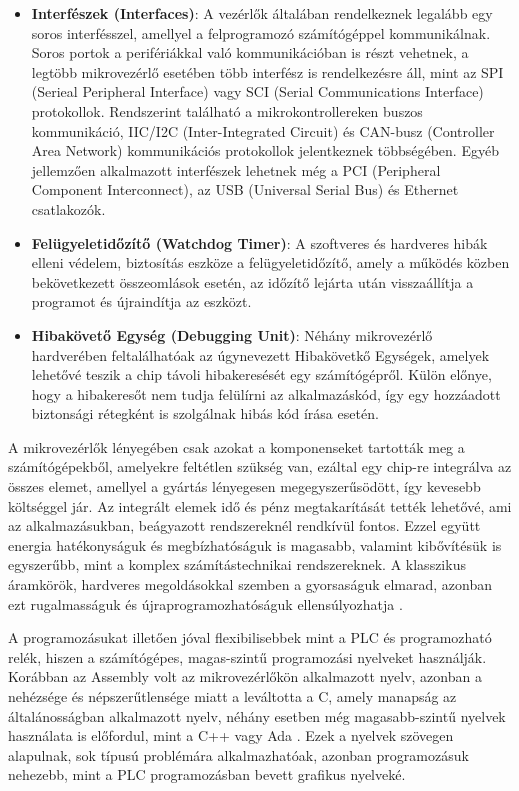 \begin{itemize}
	\item \textbf{Interfészek (Interfaces)}: A vezérlők általában rendelkeznek legalább egy soros interfésszel, amellyel a felprogramozó számítógéppel kommunikálnak. Soros portok a perifériákkal való kommunikációban is részt vehetnek, a legtöbb mikrovezérlő esetében több interfész is rendelkezésre áll, mint az SPI (Serieal Peripheral Interface) vagy SCI (Serial Communications Interface) protokollok. Rendszerint található a mikrokontrollereken buszos kommunikáció, IIC/I2C (Inter-Integrated Circuit) és CAN-busz (Controller Area Network) kommunikációs protokollok jelentkeznek többségében. Egyéb jellemzően alkalmazott interfészek lehetnek még a PCI (Peripheral Component Interconnect), az USB (Universal Serial Bus) és Ethernet csatlakozók.
	\item \textbf{Felügyeletidőzítő (Watchdog Timer)}: A szoftveres és hardveres hibák elleni védelem, biztosítás eszköze a felügyeletidőzítő, amely a működés közben bekövetkezett összeomlások esetén, az időzítő lejárta után visszaállítja a programot és újraindítja az eszközt.
	\item \textbf{Hibakövető Egység (Debugging Unit)}: Néhány mikrovezérlő hardverében feltalálhatóak az úgynevezett Hibakövetkő Egységek, amelyek lehetővé teszik a chip távoli hibakeresését egy számítógépről. Külön előnye, hogy a hibakeresőt nem tudja felülírni az alkalmazáskód, így egy hozzáadott biztonsági rétegként is szolgálnak hibás kód írása esetén.
\end{itemize}
A mikrovezérlők lényegében csak azokat a komponenseket tartották meg a számítógépekből, amelyekre feltétlen szükség van, ezáltal egy chip-re integrálva az összes elemet, amellyel a gyártás lényegesen megegyszerűsödött, így kevesebb költséggel jár. Az integrált elemek idő és pénz megtakarítását tették lehetővé, ami az alkalmazásukban, beágyazott rendszereknél rendkívül fontos. Ezzel együtt energia hatékonyságuk és megbízhatóságuk is magasabb, valamint kibővítésük is egyszerűbb, mint a komplex számítástechnikai rendszereknek. A klasszikus áramkörök, hardveres megoldásokkal szemben a gyorsaságuk elmarad, azonban ezt rugalmasságuk és újraprogramozhatóságuk ellensúlyozhatja \cite{Gridling2007}. 

A programozásukat illetően jóval flexibilisebbek mint a PLC és programozható relék, hiszen a számítógépes, magas-szintű programozási nyelveket használják. Korábban az Assembly volt az mikrovezérlőkön alkalmazott nyelv, azonban a nehézsége és népszerűtlensége miatt a leváltotta a C, amely manapság az általánosságban alkalmazott nyelv, néhány esetben még magasabb-szintű nyelvek használata is előfordul, mint a C++ vagy Ada \cite{Gridling2007}. Ezek a nyelvek szövegen alapulnak, sok típusú problémára alkalmazhatóak, azonban programozásuk nehezebb, mint a PLC programozásban bevett grafikus nyelveké.
